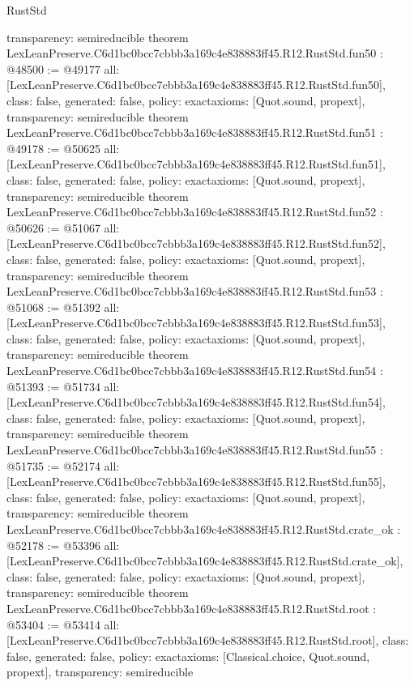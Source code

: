 \begin{lexlean}{RustStd}
\begin{coremodule}
{  transparency: semireducible
}
theorem LexLeanPreserve.C6d1bc0bcc7cbbb3a169c4e838883ff45.R12.RustStd.fun50 : @48500 := @49177 {
  all: [LexLeanPreserve.C6d1bc0bcc7cbbb3a169c4e838883ff45.R12.RustStd.fun50],
  class: false,
  generated: false,
  policy: exact{axioms: [Quot.sound, propext]},
  transparency: semireducible
}
theorem LexLeanPreserve.C6d1bc0bcc7cbbb3a169c4e838883ff45.R12.RustStd.fun51 : @49178 := @50625 {
  all: [LexLeanPreserve.C6d1bc0bcc7cbbb3a169c4e838883ff45.R12.RustStd.fun51],
  class: false,
  generated: false,
  policy: exact{axioms: [Quot.sound, propext]},
  transparency: semireducible
}
theorem LexLeanPreserve.C6d1bc0bcc7cbbb3a169c4e838883ff45.R12.RustStd.fun52 : @50626 := @51067 {
  all: [LexLeanPreserve.C6d1bc0bcc7cbbb3a169c4e838883ff45.R12.RustStd.fun52],
  class: false,
  generated: false,
  policy: exact{axioms: [Quot.sound, propext]},
  transparency: semireducible
}
theorem LexLeanPreserve.C6d1bc0bcc7cbbb3a169c4e838883ff45.R12.RustStd.fun53 : @51068 := @51392 {
  all: [LexLeanPreserve.C6d1bc0bcc7cbbb3a169c4e838883ff45.R12.RustStd.fun53],
  class: false,
  generated: false,
  policy: exact{axioms: [Quot.sound, propext]},
  transparency: semireducible
}
theorem LexLeanPreserve.C6d1bc0bcc7cbbb3a169c4e838883ff45.R12.RustStd.fun54 : @51393 := @51734 {
  all: [LexLeanPreserve.C6d1bc0bcc7cbbb3a169c4e838883ff45.R12.RustStd.fun54],
  class: false,
  generated: false,
  policy: exact{axioms: [Quot.sound, propext]},
  transparency: semireducible
}
theorem LexLeanPreserve.C6d1bc0bcc7cbbb3a169c4e838883ff45.R12.RustStd.fun55 : @51735 := @52174 {
  all: [LexLeanPreserve.C6d1bc0bcc7cbbb3a169c4e838883ff45.R12.RustStd.fun55],
  class: false,
  generated: false,
  policy: exact{axioms: [Quot.sound, propext]},
  transparency: semireducible
}
theorem LexLeanPreserve.C6d1bc0bcc7cbbb3a169c4e838883ff45.R12.RustStd.crate_ok : @52178 := @53396 {
  all: [LexLeanPreserve.C6d1bc0bcc7cbbb3a169c4e838883ff45.R12.RustStd.crate_ok],
  class: false,
  generated: false,
  policy: exact{axioms: [Quot.sound, propext]},
  transparency: semireducible
}
theorem LexLeanPreserve.C6d1bc0bcc7cbbb3a169c4e838883ff45.R12.RustStd.root : @53404 := @53414 {
  all: [LexLeanPreserve.C6d1bc0bcc7cbbb3a169c4e838883ff45.R12.RustStd.root],
  class: false,
  generated: false,
  policy: exact{axioms: [Classical.choice, Quot.sound, propext]},
  transparency: semireducible
}


\end{coremodule}
\end{lexlean}
